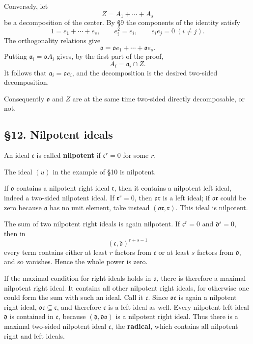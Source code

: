 \documentclass[11pt]{article}
\begin{document}
Conversely, let \[
  Z=A_1+\cdots+A_s
\] be a decomposition of the center. By §9 the components of the
identity satisfy \[
  1=e_1+\cdots+e_s,
  \qquad e_i^2=e_i,
  \qquad e_ie_j=0\ (i\ne j).
\] The orthogonality relations give \[
  \mathfrak{o}=\mathfrak{o}e_1+\cdots+\mathfrak{o}e_s.
\] Putting \(\mathfrak a_i=\mathfrak{o}A_i\) gives, by the first part of
the proof, \[
  A_i=\mathfrak a_i\cap Z.
\] It follows that \(\mathfrak a_i=\mathfrak{o}e_i\), and the
decomposition is the desired two-sided decomposition.

Consequently \(\mathfrak{o}\) and \(Z\) are at the same time two-sided
directly decomposable, or not.

\subsection{§12. Nilpotent ideals}\label{nilpotent-ideals}

An ideal \(\mathfrak c\) is called \textbf{nilpotent} if
\(\mathfrak c^r=0\) for some \(r\).

The ideal \((u)\) in the example of §10 is nilpotent.

If \(\mathfrak{o}\) contains a nilpotent right ideal \(\mathfrak r\),
then it contains a nilpotent left ideal, indeed a two-sided nilpotent
ideal. If \(\mathfrak r^r=0\), then \(\mathfrak{o}\mathfrak r\) is a
left ideal; if \(\mathfrak{o}\mathfrak r\) could be zero because
\(\mathfrak{o}\) has no unit element, take instead
\((\mathfrak{o}\mathfrak r,\mathfrak r)\). This ideal is nilpotent.

The sum of two nilpotent right ideals is again nilpotent. If
\(\mathfrak c^r=0\) and \(\mathfrak d^s=0\), then in \[
  (\mathfrak c,\mathfrak d)^{r+s-1}
\] every term contains either at least \(r\) factors from
\(\mathfrak c\) or at least \(s\) factors from \(\mathfrak d\), and so
vanishes. Hence the whole power is zero.

If the maximal condition for right ideals holds in \(\mathfrak{o}\),
there is therefore a maximal nilpotent right ideal. It contains all
other nilpotent right ideals, for otherwise one could form the sum with
such an ideal. Call it \(\mathfrak c\). Since
\(\mathfrak{o}\mathfrak c\) is again a nilpotent right ideal,
\(\mathfrak{o}\mathfrak c\subseteq\mathfrak c\), and therefore
\(\mathfrak c\) is a left ideal as well. Every nilpotent left ideal
\(\mathfrak d\) is contained in \(\mathfrak c\), because
\((\mathfrak d,\mathfrak d\mathfrak{o})\) is a nilpotent right ideal.
Thus there is a maximal two-sided nilpotent ideal \(\mathfrak c\), the
\textbf{radical}, which contains all nilpotent right and left ideals.
\end{document}
